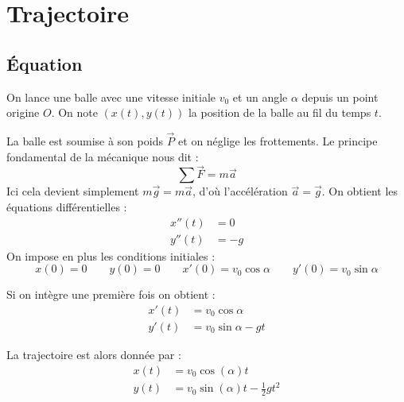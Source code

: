 \documentclass[11pt,class=report,crop=false]{standalone}
\begin{document}

%
%
%




\section{Trajectoire}

\subsection{Équation}

On lance une balle avec une vitesse initiale $v_0$ et un angle $\alpha$ depuis un point origine $O$.
On note $(x(t) , y(t))$ la position de la balle au fil du temps $t$.



La balle est soumise à son poids $\vec P$ et on néglige les frottements.
Le principe fondamental de la mécanique nous dit :
$$\sum \vec F = m \vec a$$ 
Ici cela devient simplement $m \vec g = m \vec a$, d'où l'accélération $\vec a = \vec g$.
On obtient les équations différentielles :
\begin{align*}
    x''(t) &= 0 \\
    y''(t) &= -g
\end{align*}
On impose en plus les conditions initiales :
$$
    x(0) = 0 \qquad
    y(0) = 0 \qquad
    x'(0) = v_0 \cos \alpha \qquad
    y'(0) = v_0 \sin \alpha
$$

Si on intègre une première fois on obtient :
\begin{align*}
    x'(t) &= v_0 \cos \alpha \\
    y'(t) &= v_0 \sin \alpha - g t
\end{align*}



La trajectoire est alors donnée par :
\begin{align*}
    x(t) &= v_0 \cos(\alpha) t  \\
    y(t) &= v_0 \sin(\alpha) t - \frac{1}{2} g t^2
\end{align*}
\end{document}
